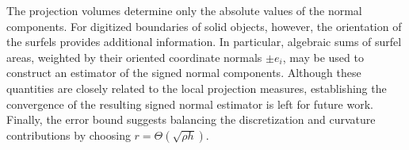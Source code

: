\begin{remark}
The projection volumes determine only the absolute values
of the normal components.
%
For digitized boundaries of solid objects, however, the orientation of
the surfels provides additional information.  In particular, algebraic
sums of surfel areas, weighted by their oriented coordinate normals
$\pm e_i$, may be used to construct an estimator of the signed normal
components.
Although these quantities are closely related to the local
projection measures, establishing the convergence of the
resulting signed normal estimator is left for future work.
%
Finally, the error bound suggests balancing the discretization
and curvature contributions by choosing
$r=\Theta(\sqrt{\rho h})$.
\end{remark}


